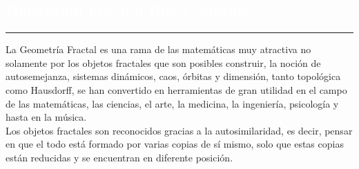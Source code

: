\begin{titlepage}
\pagecolor{white}
\BgThispage
{}
\vspace*{-1.1cm}
\noindent
\def\titulo#1{\section{#1}}
\section{\bf\large\textcolor{white}{Dimensi\'on Fractal: Box Counting}}
\vspace*{2cm}\par
\noindent

\begin{minipage}{0.5\linewidth}
\begin{minipage}{0.45\linewidth}
    \begin{flushright}
        \printauthor
    \end{flushright}
\end{minipage} \hspace{0pt}
%
\begin{minipage}{0.02\linewidth}
      \color{ptctitle} \rule{1pt}{350pt}
\end{minipage} 
\end{minipage}
\hspace*{-4.5cm}
%
\begin{minipage}{0.85\linewidth}
\begin{minipage}{0.85\linewidth}
\footnotesize
\vspace{5pt}
    \begin{resumen} La Geometr\'ia Fractal es una rama de las matem\'aticas muy atractiva no
solamente por los objetos fractales que son posibles construir, la
noci\'on de autosemejanza, sistemas din\'amicos, caos, \'orbitas y
dimensi\'on, tanto topol\'ogica como Hausdorff, se han convertido en
herramientas de gran utilidad en el campo de las matem\'aticas, las
ciencias, el arte, la medicina, la ingenier\'ia, psicolog\'ia y hasta en
la m\'usica.\\

Los objetos fractales son reconocidos gracias a la autosimilaridad,
es decir, pensar en que el todo est\'a formado por varias copias de s\'i
mismo, solo que estas copias est\'an reducidas y se encuentran en
diferente posici\'on.\\


\end{resumen}
\end{minipage}
\end{minipage}
\end{titlepage}
